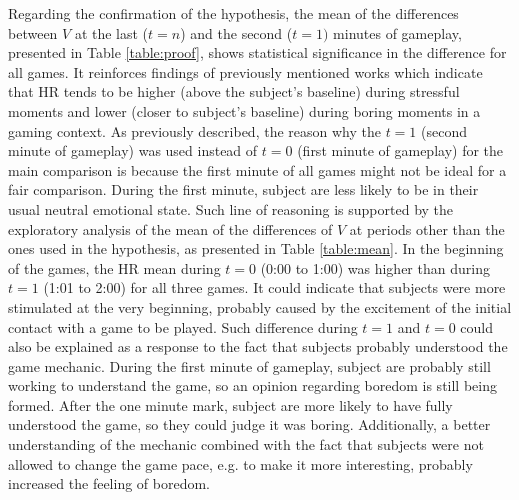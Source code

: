 Regarding the confirmation of the hypothesis, the mean of the differences between $V$ at the last ($t=n$) and the second ($t=1)$ minutes of gameplay, presented in Table \ref{table:proof}, shows statistical significance in the difference for all games. It reinforces findings of previously mentioned works \parencite{vandeput2009heart, garde2002effects, bousefsaf2013remote, rodriguez2015vr, yamakoshi2007preliminary} which indicate that HR tends to be higher (above the subject's baseline) during stressful moments and lower (closer to subject's baseline) during boring moments in a gaming context. As previously described, the reason why the $t=1$ (second minute of gameplay) was used instead of $t=0$ (first minute of gameplay) for the main comparison is because the first minute of all games might not be ideal for a fair comparison. During the first minute, subject are less likely to be in their usual neutral emotional state. Such line of reasoning is supported by the exploratory analysis of the mean of the differences of $V$ at periods other than the ones used in the hypothesis, as presented in Table \ref{table:mean}. In the beginning of the games, the HR mean during $t=0$ (0:00 to 1:00) was higher than during $t=1$ (1:01 to 2:00) for all three games. It could indicate that subjects were more stimulated at the very beginning, probably caused by the excitement of the initial contact with a game to be played. Such difference during $t=1$ and $t=0$ could also be explained as a response to the fact that subjects probably understood the game mechanic. During the first minute of gameplay, subject are probably still working to understand the game, so an opinion regarding boredom is still being formed. After the one minute mark, subject are more likely to have fully understood the game, so they could judge it was boring. Additionally, a better understanding of the mechanic combined with the fact that subjects were not allowed to change the game pace, e.g. to make it more interesting, probably increased the feeling of boredom.


